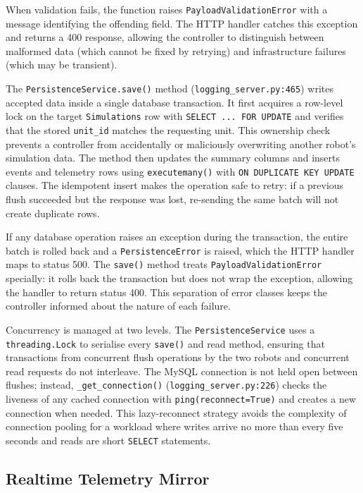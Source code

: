 When validation fails, the function raises \texttt{PayloadValidationError} with a message identifying the offending field. The HTTP handler catches this exception and returns a 400 response, allowing the controller to distinguish between malformed data (which cannot be fixed by retrying) and infrastructure failures (which may be transient).

The \texttt{PersistenceService.save()} method (\texttt{logging\_server.py:465}) writes accepted data inside a single database transaction. It first acquires a row-level lock on the target \texttt{Simulations} row with \texttt{SELECT ... FOR UPDATE} and verifies that the stored \texttt{unit\_id} matches the requesting unit. This ownership check prevents a controller from accidentally or maliciously overwriting another robot's simulation data. The method then updates the summary columns and inserts events and telemetry rows using \texttt{executemany()} with \texttt{ON DUPLICATE KEY UPDATE} clauses. The idempotent insert makes the operation safe to retry: if a previous flush succeeded but the response was lost, re-sending the same batch will not create duplicate rows.

If any database operation raises an exception during the transaction, the entire batch is rolled back and a \texttt{PersistenceError} is raised, which the HTTP handler maps to status 500. The \texttt{save()} method treats \texttt{PayloadValidationError} specially: it rolls back the transaction but does not wrap the exception, allowing the handler to return status 400. This separation of error classes keeps the controller informed about the nature of each failure.

Concurrency is managed at two levels. The \texttt{PersistenceService} uses a \texttt{threading.Lock} to serialise every \texttt{save()} and read method, ensuring that transactions from concurrent flush operations by the two robots and concurrent read requests do not interleave. The MySQL connection is not held open between flushes; instead, \texttt{\_get\_connection()} (\texttt{logging\_server.py:226}) checks the liveness of any cached connection with \texttt{ping(reconnect=True)} and creates a new connection when needed. This lazy-reconnect strategy avoids the complexity of connection pooling for a workload where writes arrive no more than every five seconds and reads are short \texttt{SELECT} statements.

\subsection{Realtime Telemetry Mirror}
\label{sec:logger-realtime}

